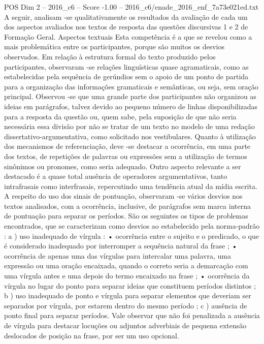 \begin{textsample}{POS Dim 2 – 2016\_c6 – Score -1.00 – 2016\_c6/enade\_2016\_enf\_7a73e021ed.txt}
A seguir, analisam -se qualitativamente os resultados da avaliação de cada um dos aspectos avaliados nos textos de resposta das questões discursivas 1 e 2 de Formação Geral.
Aspectos textuais Esta competência é a que se revelou como a mais problemática entre os participantes, porque são muitos os desvios observados.
Em relação à estrutura formal do texto produzido pelos participantes, observaram -se relações linguísticas quase agramaticais, como as estabelecidas pela sequência de gerúndios sem o apoio de um ponto de partida para a organização das informações gramaticais e semânticas, ou seja, sem oração principal.
Observou -se que uma grande parte dos participantes não organizou as ideias em parágrafos, talvez devido ao pequeno número de linhas disponibilizadas para a resposta da questão ou, quem sabe, pela suposição de que não seria necessária essa divisão por não se tratar de um texto no modelo de uma redação dissertativo-argumentativa, como solicitado nos vestibulares.
Quanto à utilização dos mecanismos de referenciação, deve -se destacar a ocorrência, em uma parte dos textos, de repetições de palavras ou expressões sem a utilização de termos sinônimos ou pronomes, como seria adequado.
Outro aspecto relevante a ser destacado é a quase total ausência de operadores argumentativos, tanto intrafrasais como interfrasais, repercutindo uma tendência atual da mídia escrita.
A respeito do uso dos sinais de pontuação, observaram -se vários desvios nos textos analisados, com a ocorrência, inclusive, de parágrafos sem marca interna de pontuação para separar os períodos.
São os seguintes os tipos de problemas encontrados, que se caracterizam como desvios ao estabelecido pela norma-padrão : a ) uso inadequado de vírgula : • ocorrência entre o sujeito e o predicado, o que é considerado inadequado por interromper a sequência natural da frase ; • ocorrência de apenas uma das vírgulas para intercalar uma palavra, uma expressão ou uma oração encaixada, quando o correto seria a demarcação com uma vírgula antes e uma depois do termo encaixado na frase ; • ocorrência da vírgula no lugar do ponto para separar ideias que constituem períodos distintos ; b ) uso inadequado de ponto e vírgula para separar elementos que deveriam ser separados por vírgula, por estarem dentro do mesmo período ; c ) ausência de ponto final para separar períodos.
Vale observar que não foi penalizada a ausência de vírgula para destacar locuções ou adjuntos adverbiais de pequena extensão deslocados de posição na frase, por ser um uso opcional.

\end{textsample}
